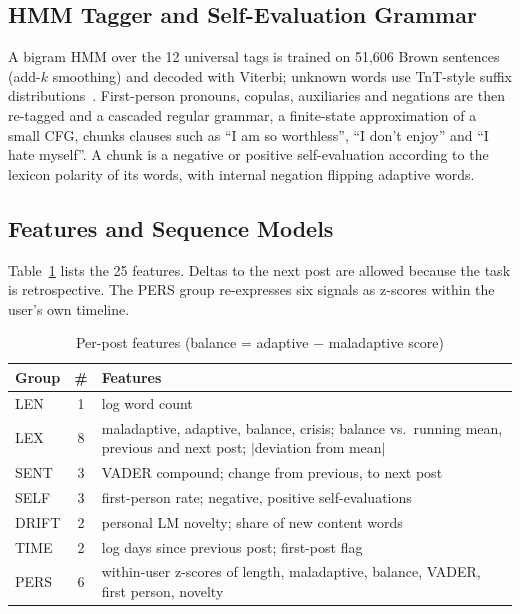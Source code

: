 \documentclass[conference]{IEEEtran}
\begin{document}
\subsection{HMM Tagger and Self-Evaluation Grammar}
A bigram HMM over the 12 universal tags is trained on 51,606 Brown sentences (add-$k$ smoothing) and decoded with Viterbi; unknown words use TnT-style suffix distributions~\cite{brants2000tnt}. First-person pronouns, copulas, auxiliaries and negations are then re-tagged and a cascaded regular grammar, a finite-state approximation of a small CFG, chunks clauses such as ``I am so worthless'', ``I don't enjoy'' and ``I hate myself''. A chunk is a negative or positive self-evaluation according to the lexicon polarity of its words, with internal negation flipping adaptive words.

\subsection{Features and Sequence Models}
Table~\ref{tab:features} lists the 25 features. Deltas to the next post are allowed because the task is retrospective. The PERS group re-expresses six signals as z-scores within the user's own timeline.

\begin{table}[t]
\caption{Per-post features (balance = adaptive $-$ maladaptive score)}
\label{tab:features}
\centering\footnotesize
\begin{tabular}{@{}lcp{}@{}}
\toprule
Group & \# & Features \\
\midrule
LEN & 1 & log word count \\
LEX & 8 & maladaptive, adaptive, balance, crisis; balance vs.\ running mean, previous and next post; $|$deviation from mean$|$ \\
SENT & 3 & VADER compound; change from previous, to next post \\
SELF & 3 & first-person rate; negative, positive self-evaluations \\
DRIFT & 2 & personal LM novelty; share of new content words \\
TIME & 2 & log days since previous post; first-post flag \\
PERS & 6 & within-user z-scores of length, maladaptive, balance, VADER, first person, novelty \\
\bottomrule
\end{tabular}
\end{table}
\end{document}
